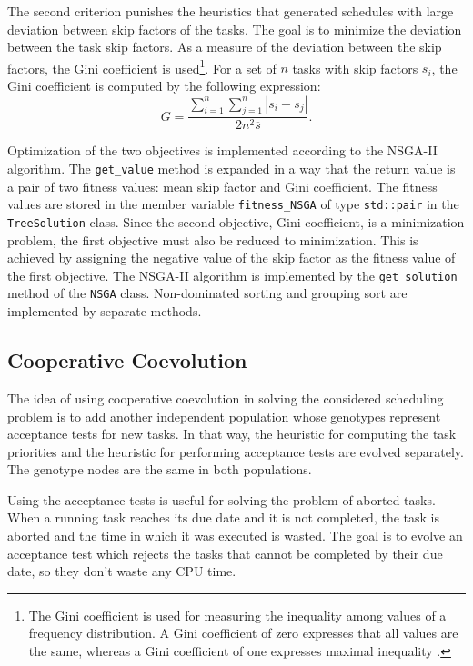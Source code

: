 The second criterion punishes the heuristics that generated schedules with large deviation between skip factors of the tasks.
The goal is to minimize the deviation between the task skip factors.
As a measure of the deviation between the skip factors, the Gini coefficient is used\footnote{The Gini coefficient is used for measuring the inequality among values of a frequency distribution. A Gini coefficient of zero expresses that all values are the same, whereas a Gini coefficient of one expresses maximal inequality \cite{gini1912variabilita}.}.
For a set of $n$ tasks with skip factors $s_i$, the Gini coefficient is computed by the following expression:
\begin{equation*}
G = \frac{\sum_{i=1}^{n}\sum_{j=1}^{n}|s_i - s_j|}{2n^2\overline{s}}.
\end{equation*}

Optimization of the two objectives is implemented according to the NSGA-II algorithm.
The \texttt{get\_value} method is expanded in a way that the return value is a pair of two fitness values: mean skip factor and Gini coefficient.
The fitness values are stored in the member variable \texttt{fitness\_NSGA} of type \texttt{std::pair} in the \texttt{TreeSolution} class.
Since the second objective, Gini coefficient, is a minimization problem, the first objective must also be reduced to minimization.
This is achieved by assigning the negative value of the skip factor as the fitness value of the first objective.
The NSGA-II algorithm is implemented by the \texttt{get\_solution} method of the \texttt{NSGA} class.
Non-dominated sorting and grouping sort are implemented by separate methods.

\subsection{Cooperative Coevolution}
The idea of using cooperative coevolution in solving the considered scheduling problem is to add another independent population whose genotypes represent acceptance tests for new tasks.
In that way, the heuristic for computing the task priorities and the heuristic for performing acceptance tests are evolved separately.
The genotype nodes are the same in both populations.

Using the acceptance tests is useful for solving the problem of aborted tasks.
When a running task reaches its due date and it is not completed, the task is aborted and the time 
in which it was executed is wasted.
The goal is to evolve an acceptance test which rejects the tasks that cannot be completed by their due date, so they don't waste any CPU time.

